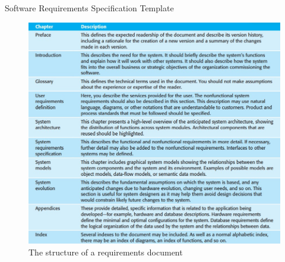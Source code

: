 \documentclass{beamer}
\begin{document}
\begin{frame}{Software Requirements Specification Template}
\begin{figure}
	\includegraphics[scale=.42]{img/m2_32.jpg}
		\caption{The structure of a requirements document }
\end{figure}
\end{frame}
\end{document}
